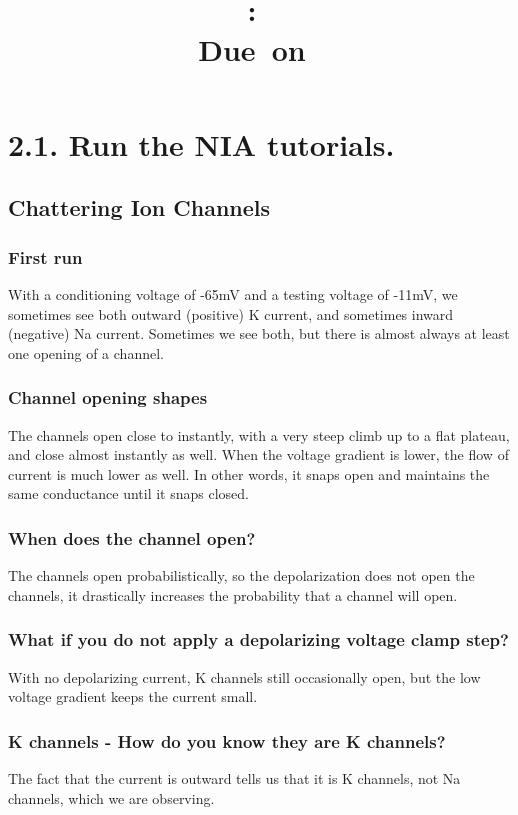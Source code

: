 \documentclass[11pt]{article}
\title{\large{\hmwkAuthorName}\vspace{0.1in}\\\textmd{\textbf{\hmwkClass:\ \hmwkTitle}}\\\normalsize\vspace{0.1in}\small{Due\ on\ \hmwkDueDate}\\\vspace{0.1in}\large{\textit{\hmwkClassInstructor}}\vspace{0.5in}}
\author{}
\date{}
\begin{document}
\maketitle

\section{2.1. Run the NIA tutorials.}
\subsection{Chattering Ion Channels}
\subsubsection{First run}
With a conditioning voltage of -65mV and a testing voltage of -11mV,
we sometimes see both outward (positive) K current, and sometimes inward (negative) Na current.  
Sometimes we see both, but there is almost always at least one opening of a channel.

\subsubsection{Channel opening shapes}
The channels open close to instantly, with a very steep climb up to a flat plateau, and close almost instantly as well.
When the voltage gradient is lower, the flow of current is much lower as well.
In other words, it snaps open and maintains the same conductance until it snaps closed.

\subsubsection{When does the channel open?}
The channels open probabilistically, so the depolarization does not open the channels,
it drastically increases the probability that a channel will open.

\subsubsection{What if you do not apply a depolarizing voltage clamp step?}
With no depolarizing current, K channels still occasionally open, but the low voltage gradient keeps the current small.

\subsubsection{K channels - How do you know they are K channels?}
The fact that the current is outward tells us that it is K channels, not Na channels, which we are observing.
\end{document}
